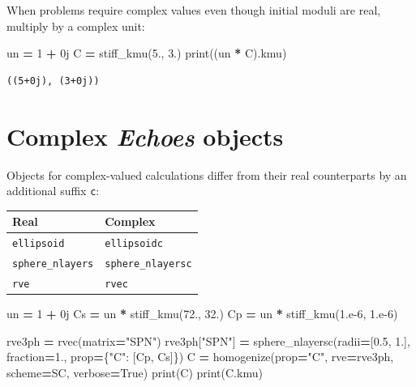 \documentclass[
  a4paper,
  numbers=noendperiod,
  DIV=12]{scrreprt}
\newenvironment{Shaded}{\begin{snugshade}}{\end{snugshade}}
\newcommand{\BuiltInTok}[1]{#1}
\newcommand{\DecValTok}[1]{\textcolor[rgb]{0.00,0.00,0.81}{#1}}
\newcommand{\FloatTok}[1]{\textcolor[rgb]{0.00,0.00,0.81}{#1}}
\newcommand{\NormalTok}[1]{#1}
\newcommand{\OperatorTok}[1]{\textcolor[rgb]{0.81,0.36,0.00}{\textbf{#1}}}
\newcommand{\OtherTok}[1]{\textcolor[rgb]{0.56,0.35,0.01}{#1}}
\newcommand{\StringTok}[1]{\textcolor[rgb]{0.31,0.60,0.02}{#1}}
\newcommand{\VariableTok}[1]{\textcolor[rgb]{0.00,0.00,0.00}{#1}}
\newcounter{none} %
\begin{document}
When problems require complex values even though initial moduli are
real, multiply by a complex unit:

\begin{Shaded}
\begin{Highlighting}[]
\NormalTok{un }\OperatorTok{=} \DecValTok{1} \OperatorTok{+} \OtherTok{0j}
\NormalTok{C }\OperatorTok{=}\NormalTok{ stiff\_kmu(}\FloatTok{5.}\NormalTok{, }\FloatTok{3.}\NormalTok{)}
\BuiltInTok{print}\NormalTok{((un }\OperatorTok{*}\NormalTok{ C).kmu)}
\end{Highlighting}
\end{Shaded}

\begin{verbatim}
((5+0j), (3+0j))
\end{verbatim}

\section{\texorpdfstring{Complex \emph{Echoes}
objects}{Complex Echoes objects}}\label{complex-echoes-objects}

Objects for complex-valued calculations differ from their real
counterparts by an additional suffix \texttt{c}:

{\def\LTcaptype{none} %
\begin{longtable}[]{@{}ll@{}}
\toprule\noalign{}
Real & Complex \\
\midrule\noalign{}
\endhead
\bottomrule\noalign{}
\endlastfoot
\texttt{ellipsoid} & \texttt{ellipsoidc} \\
\texttt{sphere\_nlayers} & \texttt{sphere\_nlayersc} \\
\texttt{rve} & \texttt{rvec} \\
\end{longtable}
}

\begin{Shaded}
\begin{Highlighting}[]
\NormalTok{un }\OperatorTok{=} \DecValTok{1} \OperatorTok{+} \OtherTok{0j}
\NormalTok{Cs }\OperatorTok{=}\NormalTok{ un }\OperatorTok{*}\NormalTok{ stiff\_kmu(}\FloatTok{72.}\NormalTok{, }\FloatTok{32.}\NormalTok{)}
\NormalTok{Cp }\OperatorTok{=}\NormalTok{ un }\OperatorTok{*}\NormalTok{ stiff\_kmu(}\FloatTok{1.e{-}6}\NormalTok{, }\FloatTok{1.e{-}6}\NormalTok{)}

\NormalTok{rve3ph }\OperatorTok{=}\NormalTok{ rvec(matrix}\OperatorTok{=}\StringTok{"SPN"}\NormalTok{)}
\NormalTok{rve3ph[}\StringTok{"SPN"}\NormalTok{] }\OperatorTok{=}\NormalTok{ sphere\_nlayersc(radii}\OperatorTok{=}\NormalTok{[}\FloatTok{0.5}\NormalTok{, }\FloatTok{1.}\NormalTok{], fraction}\OperatorTok{=}\FloatTok{1.}\NormalTok{,}
\NormalTok{                                prop}\OperatorTok{=}\NormalTok{\{}\StringTok{"C"}\NormalTok{: [Cp, Cs]\})}
\NormalTok{C }\OperatorTok{=}\NormalTok{ homogenize(prop}\OperatorTok{=}\StringTok{"C"}\NormalTok{, rve}\OperatorTok{=}\NormalTok{rve3ph, scheme}\OperatorTok{=}\NormalTok{SC, verbose}\OperatorTok{=}\VariableTok{True}\NormalTok{)}
\BuiltInTok{print}\NormalTok{(C)}
\BuiltInTok{print}\NormalTok{(C.kmu)}
\end{Highlighting}
\end{Shaded}
\end{document}

